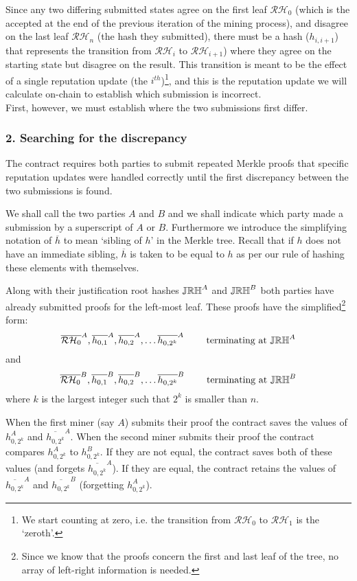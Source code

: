Since any two differing submitted states agree on the first leaf $\mathcal{RH}_0$ (which is the  accepted at the end of the previous iteration of the mining process), and disagree on the last leaf $\mathcal{RH}_n$ (the hash they submitted), there must be a hash ($h_{i,i+1}$) that represents the transition from $\mathcal{RH}_i$ to $\mathcal{RH}_{i+1}$) where they agree on the starting state but disagree on the result. This transition is meant to be the effect of a single reputation update (the $i^{th}$)\footnote{We start counting at zero, i.e. the transition from $\mathcal{RH}_{0}$ to $\mathcal{RH}_{1}$ is the `zeroth'.}, and this is the reputation update we will calculate on-chain to establish which submission is incorrect.\\

\noindent First, however, we must establish where the two submissions first differ.

\subsubsection*{2. Searching for the discrepancy}
The contract requires both parties to submit repeated Merkle proofs that specific reputation updates were handled correctly until the first discrepancy between the two submissions is found. 

We shall call the two parties $A$ and $B$ and we shall indicate which party made a submission by a superscript of $A$ or $B$. Furthermore we introduce the simplifying notation of $\overline{h}$ to mean `sibling of $h$' in the Merkle tree. Recall that if $h$ does not have an immediate sibling, $\overline{h}$ is taken to be equal to $h$ as per our rule of hashing these elements with themselves.

Along with their justification root hashes $\mathbb{JRH}^A$ and $\mathbb{JRH}^B$ both parties have already submitted proofs for the left-most leaf. These proofs have the simplified\footnote{Since we know that the proofs concern the first and last leaf of the tree, no array of left-right information is needed.} form:
\[
 \overline{\mathcal{RH}_0}^A, \overline{h_{0,1}}^A, \overline{h_{0,2}}^A, \ldots \overline{h_{0,2^k}}^A \qquad \textnormal{ terminating at } \mathbb{JRH}^A 
\]
and
\[
 \overline{\mathcal{RH}_0}^B, \overline{h_{0,1}}^B, \overline{h_{0,2}}^B, \ldots \overline{h_{0,2^k}}^B \qquad \textnormal{ terminating at } \mathbb{JRH}^B 
\]
where $k$ is the largest integer such that $2^k$ is smaller than $n$.

When the first miner (say $A$) submits their proof the contract saves the values of $h_{0,2^k}^A$ and $\overline{h_{0,2^k}}^A$. When the second miner submits their proof the contract compares $h_{0,2^k}^A$ to $h_{0,2^k}^B$. If they are not equal, the contract saves both of these values (and forgets $\overline{h_{0,2^k}}^A$). If they are equal, the contract retains the values of $\overline{h_{0,2^k}}^A$ and $\overline{h_{0,2^k}}^B$ (forgetting $h_{0,2^k}^A$).

